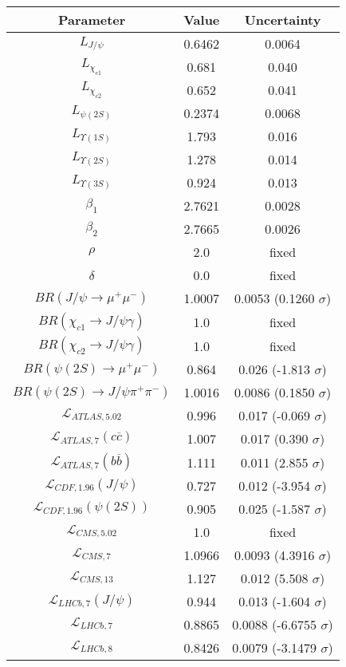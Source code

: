 \begin{table}[h!]
\centering
\begin{tabular}{c|c|c}
Parameter & Value & Uncertainty \\
\hline
$L_{J/\psi}$ & 0.6462 & 0.0064 \\
$L_{\chi_{c1}}$ & 0.681 & 0.040 \\
$L_{\chi_{c2}}$ & 0.652 & 0.041 \\
$L_{\psi(2S)}$ & 0.2374 & 0.0068 \\
$L_{\Upsilon(1S)}$ & 1.793 & 0.016 \\
$L_{\Upsilon(2S)}$ & 1.278 & 0.014 \\
$L_{\Upsilon(3S)}$ & 0.924 & 0.013 \\
$\beta_1$ & 2.7621 & 0.0028 \\
$\beta_2$ & 2.7665 & 0.0026 \\
$\rho$ & 2.0 & fixed \\
$\delta$ & 0.0 & fixed \\
$BR(J/\psi\rightarrow\mu^+\mu^-)$ & 1.0007 & 0.0053 (0.1260 $\sigma$) \\
$BR(\chi_{c1}\rightarrow J/\psi\gamma)$ & 1.0 & fixed \\
$BR(\chi_{c2}\rightarrow J/\psi\gamma)$ & 1.0 & fixed \\
$BR(\psi(2S)\rightarrow\mu^+\mu^-)$ & 0.864 & 0.026 (-1.813 $\sigma$) \\
$BR(\psi(2S)\rightarrow J/\psi\pi^+\pi^-)$ & 1.0016 & 0.0086 (0.1850 $\sigma$) \\
$\mathcal L_{ATLAS,5.02}$ & 0.996 & 0.017 (-0.069 $\sigma$) \\
$\mathcal L_{ATLAS,7}(c\overline c)$ & 1.007 & 0.017 (0.390 $\sigma$) \\
$\mathcal L_{ATLAS,7}(b\overline b)$ & 1.111 & 0.011 (2.855 $\sigma$) \\
$\mathcal L_{CDF,1.96}(J/\psi)$ & 0.727 & 0.012 (-3.954 $\sigma$) \\
$\mathcal L_{CDF,1.96}(\psi(2S))$ & 0.905 & 0.025 (-1.587 $\sigma$) \\
$\mathcal L_{CMS,5.02}$ & 1.0 & fixed \\
$\mathcal L_{CMS,7}$ & 1.0966 & 0.0093 (4.3916 $\sigma$) \\
$\mathcal L_{CMS,13}$ & 1.127 & 0.012 (5.508 $\sigma$) \\
$\mathcal L_{LHCb,7}(J/\psi)$ & 0.944 & 0.013 (-1.604 $\sigma$) \\
$\mathcal L_{LHCb,7}$ & 0.8865 & 0.0088 (-6.6755 $\sigma$) \\
$\mathcal L_{LHCb,8}$ & 0.8426 & 0.0079 (-3.1479 $\sigma$) \\

\end{tabular}
\end{table}
